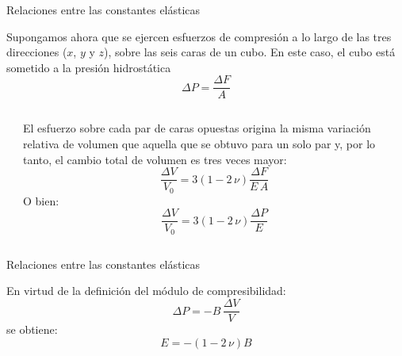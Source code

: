 \documentclass[11pt,handout,aspectratio=1610]{beamer}
\begin{document}
\begin{frame}{Relaciones entre las constantes elásticas}

    Supongamos ahora que se ejercen esfuerzos de compresión a lo largo de las tres direcciones ($x$, $y$ y $z$), sobre las seis caras de un cubo. En este caso, el cubo está sometido a la presión hidrostática $$\Delta P = \frac{\Delta F}{A}$$
    
    \begin{columns}
        \begin{column}{0.3\textwidth}
        \end{column}
        \begin{column}{0.7\textwidth}
            El esfuerzo sobre cada par de caras opuestas origina la misma variación relativa de volumen que aquella que se obtuvo para un solo par y, por lo tanto, el cambio total de volumen es tres veces mayor: $$ \frac{\Delta V}{V_0} = 3 \left(1 - 2 \, \nu\right) \frac{\Delta F}{E \, A} $$ O bien: $$ \frac{\Delta V}{V_0} = 3 \left(1 - 2 \, \nu\right) \frac{\Delta P}{E} $$
        \end{column}
    \end{columns}
    
\end{frame}

\begin{frame}{Relaciones entre las constantes elásticas}

    En virtud de la definición del módulo de compresibilidad: $$ \Delta P = - B \, \frac{\Delta V}{V} $$ se obtiene: $$ E = - \left(1-2\, \nu\right) B $$

\end{frame}
\end{document}

